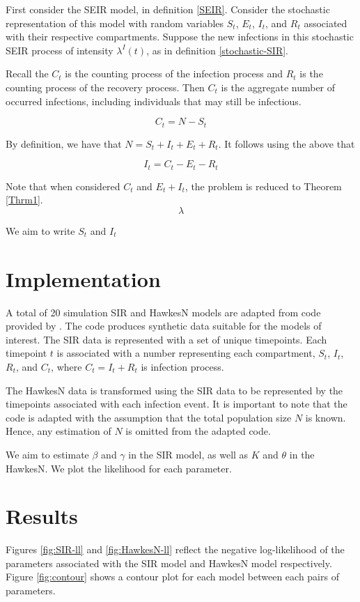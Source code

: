 \documentclass[12pt]{article}
\begin{document}
First consider the SEIR model, in definition \ref{SEIR}. Consider the stochastic representation of this  model with random variables $S_t$, $E_t$, $I_t$, and $R_t$ associated with their respective compartments. Suppose the new infections in this stochastic SEIR process of intensity $\lambda^I(t)$, as in definition \ref{stochastic-SIR}.

Recall the $C_t$ is the counting process of the infection process and $R_t$ is the counting process of the recovery process. Then $C_t$ is the aggregate number of occurred infections, including individuals that may still be infectious. 

$$
C_t = N - S_t
$$

By definition, we have that $N = S_t + I_t + E_t + R_t$. It follows using the above that

$$
I_t =  C_t - E_t - R_t
$$


Note that when considered $C_t$ and $E_t + I_t$, the problem is reduced to Theorem \ref{Thrm1}. 
$$
\lambda
$$



We aim to write $S_t$ and $I_t$

\section{Implementation}

A total of 20 simulation SIR and HawkesN models are adapted from code provided by \citep{Rizoiu2018}. The code produces synthetic data suitable for the models of interest. The SIR data is represented with a set of unique timepoints. Each timepoint $t$ is associated with a number representing each compartment, $S_t$, $I_t$, $R_t$, and $C_t$, where $C_t = I_t + R_t$ is infection process. 
 
The HawkesN data is transformed using the SIR data to be represented by the timepoints associated with each infection event. It is important to note that the code is adapted with the assumption that the total population size $N$ is known. Hence, any estimation of $N$ is omitted from the adapted code. 

We aim to estimate $\beta$ and $\gamma$ in the SIR model, as well as $K$ and $\theta$ in the HawkesN. We plot the likelihood for each parameter. 


\section{Results}

Figures \ref{fig:SIR-ll} and \ref{fig:HawkesN-ll} reflect the negative log-likelihood of the parameters associated with the SIR model and HawkesN model respectively. Figure \ref{fig:contour} shows a contour plot for each model between each pairs of parameters. 
\end{document}
